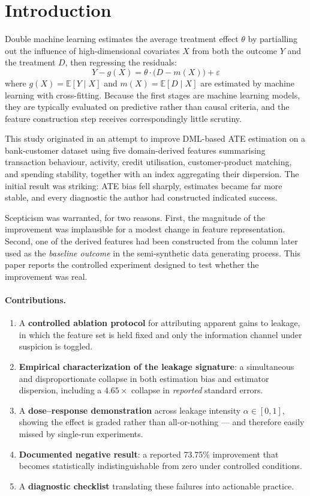 \documentclass[11pt]{article}
\begin{document}
\section{Introduction}

Double machine learning \cite{chernozhukov2018} estimates the average treatment effect $\theta$ by partialling out the influence of high-dimensional covariates $X$ from both the outcome $Y$ and the treatment $D$, then regressing the residuals:
\begin{equation}
Y - g(X) = \theta \cdot \bigl(D - m(X)\bigr) + \varepsilon
\end{equation}
where $g(X) = \mathbb{E}[Y \mid X]$ and $m(X) = \mathbb{E}[D \mid X]$ are estimated by machine learning with cross-fitting. Because the first stages are machine learning models, they are typically evaluated on predictive rather than causal criteria, and the feature construction step receives correspondingly little scrutiny.

This study originated in an attempt to improve DML-based ATE estimation on a bank-customer dataset using five domain-derived features summarising transaction behaviour, activity, credit utilisation, customer-product matching, and spending stability, together with an index aggregating their dispersion. The initial result was striking: ATE bias fell sharply, estimates became far more stable, and every diagnostic the author had constructed indicated success.

Scepticism was warranted, for two reasons. First, the magnitude of the improvement was implausible for a modest change in feature representation. Second, one of the derived features had been constructed from the column later used as the \emph{baseline outcome} in the semi-synthetic data generating process. This paper reports the controlled experiment designed to test whether the improvement was real.

\paragraph{Contributions.}
\begin{enumerate}
\item A \textbf{controlled ablation protocol} for attributing apparent gains to leakage, in which the feature set is held fixed and only the information channel under suspicion is toggled.
\item \textbf{Empirical characterization of the leakage signature}: a simultaneous and disproportionate collapse in both estimation bias and estimator dispersion, including a $4.65\times$ collapse in \emph{reported} standard errors.
\item A \textbf{dose--response demonstration} across leakage intensity $\alpha \in [0,1]$, showing the effect is graded rather than all-or-nothing --- and therefore easily missed by single-run experiments.
\item \textbf{Documented negative result}: a reported 73.75\% improvement that becomes statistically indistinguishable from zero under controlled conditions.
\item A \textbf{diagnostic checklist} translating these failures into actionable practice.
\end{enumerate}
\end{document}
